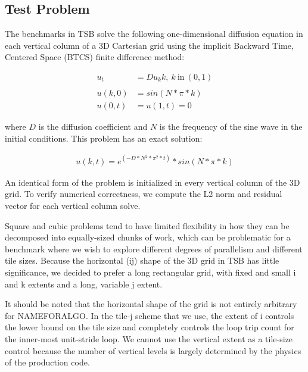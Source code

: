 \documentclass{sig-alternate-05-2015}
\begin{document}
\subsection{Test Problem}
\label{sec:experimental_setup:test_problem}

The benchmarks in TSB solve the following one-dimensional diffusion equation in
each vertical column of a 3D Cartesian grid using the implicit Backward Time,
Centered Space (BTCS) finite difference method:

\begin{align*}
u_t &= Du_kk, \: k \: \text{in} \: (0, 1) \\
                                          \\
u(k, 0) &= sin(N * \pi * k)               \\
u(0, t) &= u(1, t) = 0
\end{align*}

\noindent where \(D\) is the diffusion coefficient and \(N\) is the frequency of the sine
wave in the initial conditions. This problem has an exact solution:

\begin{align*}
u(k, t) = e ^ (-D * N^2 * \pi^2 * t) * sin(N * \pi * k)
\end{align*}

An identical form of the problem is initialized in every vertical column of the
3D grid. To verify numerical correctness, we compute the L2 norm and residual
vector for each vertical column solve.

Square and cubic problems tend to have limited flexibility in how they can be
decomposed into equally-sized chunks of work, which can be problematic for a
benchmark where we wish to explore different degrees of parallelism and
different tile sizes. Because the horizontal (ij) shape of the 3D grid in TSB
has little significance, we decided to prefer a long rectangular grid, with
fixed and small i and k extents and a long, variable j extent.

It should be noted that the horizontal shape of the grid is not entirely
arbitrary for NAMEFORALGO. In the tile-j scheme that we use, the extent of i controls the
lower bound on the tile size and completely controls the loop trip count for
the inner-most unit-stride loop. We cannot use the vertical extent as a
tile-size control because the number of vertical levels is largely determined
by the physics of the production code.
\end{document}
